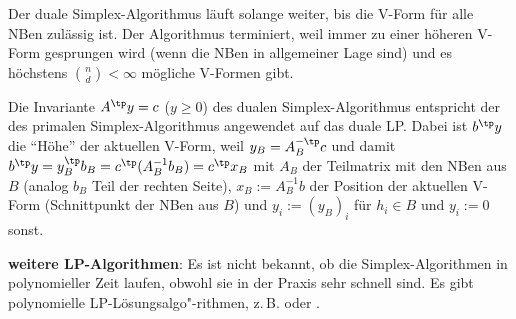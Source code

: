 Der duale Simplex-Algorithmus läuft solange weiter, bis die V-Form für alle NBen zulässig ist.
Der Algorithmus terminiert, weil immer zu einer höheren V-Form gesprungen wird
(wenn die NBen in allgemeiner Lage sind) und es höchstens $\binom{n}{d} < \infty$
mögliche V-Formen gibt.

Die Invariante $A^\tp y = c$ ($y \ge 0$)
des dualen Simplex-Algorithmus entspricht der des primalen
Simplex-Algorithmus angewendet auf das duale LP.
Dabei ist $b^\tp y $ die "`Höhe"' der aktuellen V-Form,
weil $y_B = A_B^{-\tp} c$ und damit
$b^\tp y = y_B^\tp b_B = c^\tp (A_B^{-1} b_B) = c^\tp x_B$
mit $A_B$ der Teilmatrix mit den NBen aus $B$
(analog $b_B$ Teil der rechten Seite),
$x_B := A_B^{-1} b$ der Position der aktuellen V-Form (Schnittpunkt der NBen aus $B$) und
$y_i := (y_B)_i$ für $h_i \in B$ und $y_i := 0$ sonst.

\linie

\textbf{weitere LP-Algorithmen}:
Es ist nicht bekannt, ob die Simplex-Algorithmen in polynomieller Zeit laufen,
obwohl sie in der Praxis sehr schnell sind.
Es gibt polynomielle LP-Lösungsalgo"-rithmen, z.\,B.  oder
.

\pagebreak

